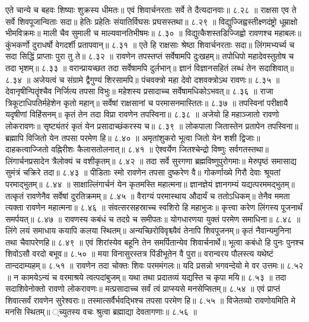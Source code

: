 एते चान्ये च बहवः शिष्याः शुक्रस्य धीमतः॥
एवं शिवार्चनरताः सर्वे ते दैत्यदानवाः॥ ८.२८ ॥
राक्षसा एव ते सर्वे शिवपूजान्विताः सदा॥
हेतिः प्रहेतिः संयातिर्विघसः प्रघसस्तथा॥ ८.२९ ॥
विद्युज्जिह्वस्तीक्ष्णदंष्ट्रो धूम्राक्षो भीमविक्रमः॥
माली चैव सुमाली च माल्यवानतिभीषमः॥ ८.३० ॥
विद्युत्कैशस्तडिज्जिह्वो रावणश्च महाबलः॥
कुंभकर्णो दुराधर्षो वेगदर्शी प्रतापवान्॥ ८.३१ ॥
एते हि राक्षसाः श्रेष्ठा शिवार्चनरताः सदा॥
लिंगमभ्यर्च्य च सदा सिद्धिं प्राप्ताः पुरा तु ते॥ ८.३२ ॥
रावणेन तपस्तप्तं सर्वेषामपि दुःखहम्॥
तपोधिपो महादेवस्तुतोष च तदा भृशम्॥ ८.३३ ॥
वरान्प्रायच्छत तदा सर्वेषामपि दुर्लभान्॥
ज्ञानं विज्ञानसहितं लब्धं तेन सदाशिवात्॥ ८.३४ ॥
अजेयत्वं च संग्रामे द्वैगुण्यं शिरसामपि॥
पंचवक्त्रो महा देवो दशवक्त्रोऽथ रावणः॥ ८.३५ ॥
देवानृषीन्पितॄंश्चैव निर्जित्य तपसा विभुः॥
महेशस्य प्रसादाच्च सर्वेषामधिकोऽभवत्॥ ८.३६ ॥
राजा त्रिकूटाधिपतिर्महेशेन कृतो महान्॥
सर्वेषां राक्षसानां च परमासनमास्तितः॥ ८.३७ ॥
तपस्विनां परीक्षायै यदृषीणां विहिंसनम्॥
कृतं तेन तदा विप्रा रावणेन तपस्विना॥ ८.३८ ॥
अजेयो हि महाञ्जातो रावणो लोकरावणः॥
सृष्ट्यंतरं कृतं येन प्रसादाच्छंकरस्य च॥ ८.३९ ॥
लोकपाला जितास्तेन प्रतापेन तपस्विना॥
ब्रह्मापि विजितो येन तपसा परमेण हि॥ ८.४० ॥
अमृतांशुकरो भूत्वा जितो येन शशी द्विजाः॥
दाहकत्वाज्जितो वह्निरीशः कैलासतोलनात्॥ ८.४१ ॥
ऐश्वर्येण जितश्चेन्द्रो विष्णुः सर्वगतस्तथा॥
लिंगार्चनप्रसादेन त्रैलोक्यं च वशीकृतम्॥ ८.४२ ॥
तदा सर्वे सुरगणा ब्रह्मविष्णुपुरोगमाः॥
मेरुपृष्ठं समासाद्य सुमंत्रं चक्रिरे तदा॥ ८.४३ ॥
पीडिताः स्मो रावणेन तपसा दुष्करेण वै॥
गोकर्णाख्ये गिरौ देवाः श्रूयतां परमाद्भुतम्॥ ८.४४ ॥
साक्षाल्लिंगार्चनं येन कृतमस्ति महात्मना॥
ज्ञानज्ञेयं ज्ञानगम्यं यद्यत्परममद्भुतम्॥
तत्कृतं रावणेनैव सर्वेषां दुरतिक्रमम्॥ ८.४५ ॥
वैराग्यं परमास्थाय औदार्यं च ततोऽधिकम्॥
तेनैव ममता त्यक्ता रावणेन महात्मना॥ ८.४६ ॥
संवत्सरसहस्राच्च स्वशिरो हि महाभुजः॥
कृत्त्वा करेण लिंगस्य पूजनार्थं समर्पयत्॥ ८.४७ ॥
रावणस्य कबंधं च तदग्रे च समीपतः॥
योगधारणया युक्तं परमेण समाधिना॥ ८.४८ ॥
लिंगे लयं समाधाय कयापि कलया स्थितम्॥
अन्यच्छिरोविवृश्च्यैवं तेनापि शिवपूजनम्॥
कृतं नैवान्यमुनिना तथा चैवापरेणहि॥ ८.४९ ॥
एवं शिरांस्येव बहूनि तेन समर्पितान्येव शिवार्चनार्थे॥
भूत्वा कबंधो हि पुनः पुनश्च शिवोऽसौ वरदो बभूव॥ ८.५० ॥
मया विनासुरस्तत्र पिंडीभूतेन वै पुरा॥
वरान्वरय पौलस्त्य यथेष्टं तान्ददाम्यहम्॥ ८.५१ ॥
रावणेन तदा चोक्तः शिवः परममंगलः॥
यदि प्रसन्नो भगवन्देयो मे वर उत्तमः॥ ८.५२ ॥
न कामयेऽन्यं च वरमाश्रये त्वत्पदांबुजम्॥
यथा तथा प्रदातव्यं यद्यस्ति च कृपा मयि॥ ८.५३ ॥
तदा सदाशिवेनोक्तो रावणो लोकरावणः॥
मत्प्रसादाच्च सर्वं त्वं प्राप्स्यसे मनसेप्सितम्॥ ८.५४ ॥
एवं प्राप्तं शिवात्सर्वं रावणेन सुरेश्वराः॥
तस्मात्सर्वैर्भवद्भिश्च तपसा परमेण हि॥ ८.५५ ॥
विजेतव्यो रावणोयमिति मे मनसि स्थितम्॥
्च्युतस्य वचः श्रुत्वा ब्रह्माद्या देवतागणाः॥ ८.५६ ॥
